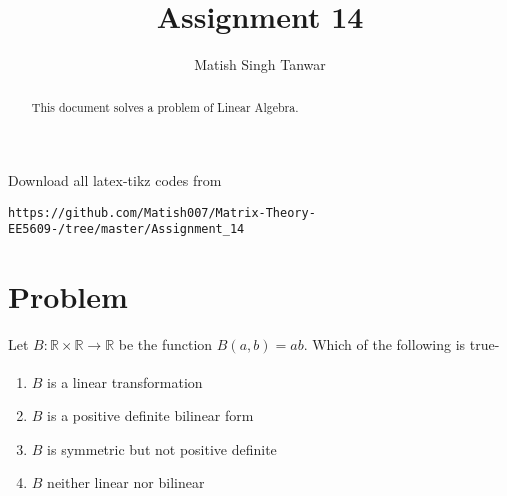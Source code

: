 \documentclass[journal,12pt,twocolumn]{IEEEtran}
\begin{document}
 \vspace{3cm}
 \title{Assignment 14}
 \author{Matish Singh Tanwar}
 \maketitle
 \newpage
 \bigskip
 \renewcommand{\thetable}{\theenumi}
\vspace{1.0cm}
\begin{abstract}
This document solves a problem of Linear Algebra.
\end{abstract}
\vspace{0.5cm}
%
Download all latex-tikz codes from 
\begin{lstlisting}
https://github.com/Matish007/Matrix-Theory-EE5609-/tree/master/Assignment_14
\end{lstlisting}
%
%
\vspace{0.5mm}
\section{Problem}
Let $B: \mathbb{R} \times \mathbb{R} \xrightarrow[]{} \mathbb{R}$ be the function $B(a,b) = ab$. Which of the following is true-
\begin{enumerate}
\item{$B$ is a linear transformation}
\item{$B$ is a positive definite bilinear form}
\item{$B$ is symmetric but not positive definite}
\item{$B$ neither linear nor bilinear}
\end{enumerate}
\end{document}
